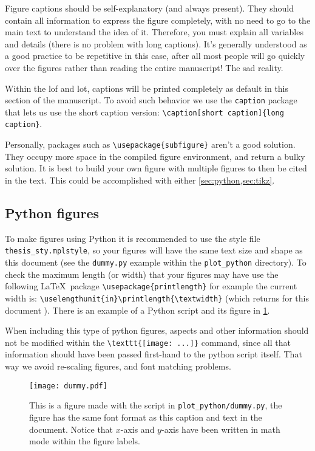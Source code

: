 Figure captions should be self-explanatory (and always present). They should contain all information to express the figure completely, with no need to go to the main text to understand the idea of it. Therefore, you must explain all variables and details (there is no problem with long captions). It's generally understood as a good practice to be repetitive in this case, after all most people will go quickly over the figures rather than reading the entire manuscript! The sad reality.

Within the \gls{lof} and \gls{lot}, captions will be printed completely as default in this section of the manuscript. To avoid such behavior we use the \texttt{caption} package that lets us use the short caption version: \verb|\caption[short caption]{long caption}|.

Personally, packages such as \verb|\usepackage{subfigure}| aren't a good solution. They occupy more space in the compiled figure environment, and return a bulky solution. It is best to build your own figure with multiple figures to then be cited in the text. This could be accomplished with either \cref{sec:python,sec:tikz}.

\subsection{Python figures}
\label{sec:python}

To make figures using Python it is recommended to use the style file \texttt{thesis\_sty.mplstyle}, so your figures will have the same text size and shape as this document (see the \texttt{dummy.py} example within the \texttt{plot\_python} directory).
To check the maximum length (or width) that your figures may have use the following \LaTeX~package \verb|\usepackage{printlength}| for example the current width is: \verb|\uselengthunit{in}\printlength{\textwidth}| (which returns for this document \printlength{\textwidth}). There is an example of a Python script and its figure in \cref{fig:dummy}.

When including this type of python figures, aspects and other information should not be modified within the \verb|\texttt{[image: ...]}| command, since all that information should have been passed first-hand to the python script itself. That way we avoid re-scaling figures, and font matching problems.

\begin{figure}[t]
  \centering
  \texttt{[image: dummy.pdf]}
  \caption[My first Python figure]{This is a figure made with the script in \texttt{plot\_python/dummy.py}, the figure has the same font format as this caption and text in the document. Notice that $x$-axis and $y$-axis have been written in math mode within the figure labels.}
  \label{fig:dummy}
\end{figure}

